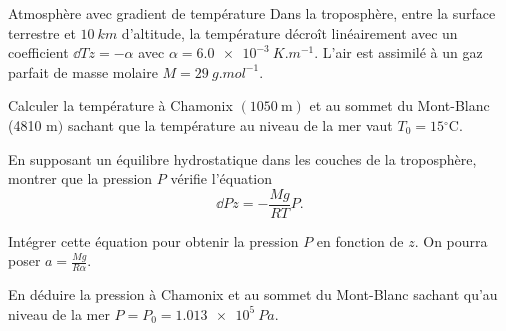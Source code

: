 \begin{exo}[PC][1][TD]{Atmosphère avec gradient de température}
Dans la troposphère, entre la surface terrestre et $\SI{10}{km}$ d'altitude, la température décroît linéairement avec un coefficient $\dd{T}{z}=-\alpha$ avec $\alpha=\SI{6.0e-3}{K.m^{-1}}$. L'air est assimilé à un gaz parfait de masse molaire  $M=\SI{29}{g.mol^{-1}}$.
\begin{quest}
\item Calculer la température à Chamonix $(1050 \mathrm{~m})$ et au sommet du Mont-Blanc (4810 $\mathrm{m})$ sachant que la température au niveau de la mer vaut $T_0=15{ }^{\circ} \mathrm{C}$.
\item En supposant un équilibre hydrostatique dans les couches de la troposphère, montrer que la pression $P$ vérifie l'équation
$$
\dd{P}{z} = - \frac{Mg}{RT} P.
$$
\item Intégrer cette équation pour obtenir la pression $P$ en fonction de $z$. On pourra poser $a=\frac{M g}{R \alpha}$.
\item En déduire la pression à Chamonix et au sommet du Mont-Blanc sachant qu'au niveau de la mer $P=P_0=\SI{1.013e5}{Pa}$.
\end{quest}
\end{exo}

